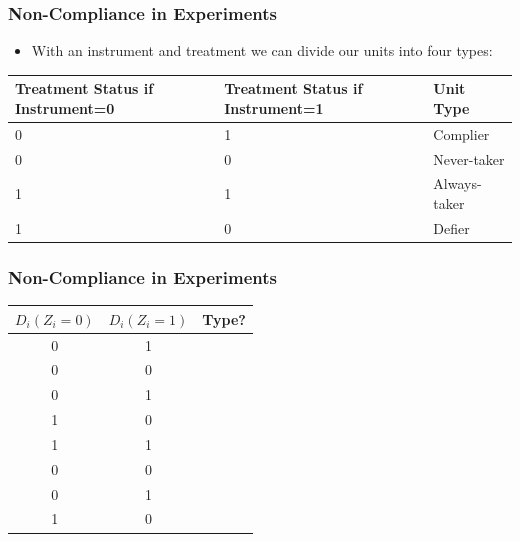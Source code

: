 \documentclass[xcolor=x11names,compress]{beamer}\usepackage[]{graphicx}\usepackage[]{color}
\renewcommand{\(}{\begin{columns}}
\renewcommand{\)}{\end{columns}}
\newcommand{\<}[1]{\begin{column}{#1}}
\renewcommand{\>}{\end{column}}
\begin{document}
\begin{frame}
\frametitle{Non-Compliance in Experiments}
\begin{itemize}
\item With an instrument and treatment we can divide our units into four types:
\end{itemize}
\begin{table}[htbp]
  \centering
    \begin{tabular}{|p{3cm}|p{3cm}|p{3cm}|}
    \hline
    \multicolumn{1}{|p{3cm}|}{\textbf{Treatment Status if Instrument=0}} & \multicolumn{1}{p{3cm}|}{\textbf{Treatment Status if Instrument=1}} & \textbf{Unit Type} \bigstrut\\
    \hline
    0     & 1     & Complier \bigstrut\\
    \hline
    0     & 0     & Never-taker \bigstrut\\
    \hline
    1     & 1     & Always-taker \bigstrut\\
    \hline
    1     & 0     & Defier \bigstrut\\
    \hline
    \end{tabular}%
  \label{tab:addlabel}%
\end{table}%
\pause
\end{frame}

\begin{frame}
\frametitle{Non-Compliance in Experiments}
\begin{table}[htbp]
  \centering
    \begin{tabular}{c|c|c}
    \multicolumn{1}{l}{$D_i(Z_i=0)$} & \multicolumn{1}{l}{$D_i(Z_i=1)$} & \multicolumn{1}{l}{Type?} \\
    \hline
    0     & 1     &  \\
    0     & 0     &  \\
    0     & 1     &  \\
    1     & 0     &  \\
    1     & 1     &  \\
    0     & 0     &  \\
    0     & 1     &  \\
    1     & 0     &  \\
    \end{tabular}%
  \label{tab:addlabel}%
\end{table}%

\end{frame}
\end{document}
